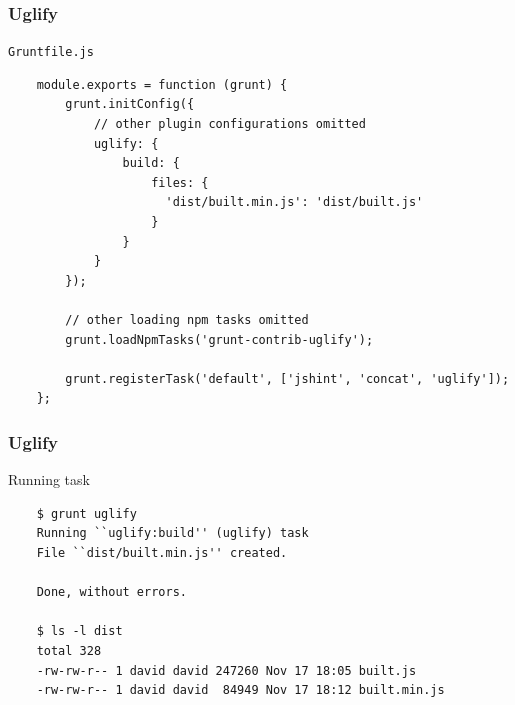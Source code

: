 \begin{frame}[fragile]
  \frametitle{Uglify}

  \begin{block}{\texttt{Gruntfile.js}}
    {\tiny
    \begin{verbatim}
    module.exports = function (grunt) {
        grunt.initConfig({
            // other plugin configurations omitted
            uglify: {
                build: {
                    files: {
                      'dist/built.min.js': 'dist/built.js'
                    }
                }
            }
        });

        // other loading npm tasks omitted
        grunt.loadNpmTasks('grunt-contrib-uglify');

        grunt.registerTask('default', ['jshint', 'concat', 'uglify']);
    };
    \end{verbatim}
    }
  \end{block}
\end{frame}

\begin{frame}[fragile]
  \frametitle{Uglify}

  \begin{block}{Running task}
    {\tiny
    \begin{verbatim}
    $ grunt uglify
    Running ``uglify:build'' (uglify) task
    File ``dist/built.min.js'' created.

    Done, without errors.

    $ ls -l dist
    total 328
    -rw-rw-r-- 1 david david 247260 Nov 17 18:05 built.js
    -rw-rw-r-- 1 david david  84949 Nov 17 18:12 built.min.js
    \end{verbatim}
    }
  \end{block}
\end{frame}
